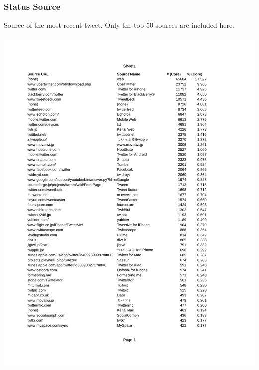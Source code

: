 \onecolumn
\subsubsection{Status Source}
Source of the most recent tweet.  Only the top 50 sources are included here.\\\\
 \includegraphics[width=6in]{sources.pdf}

\twocolumn
